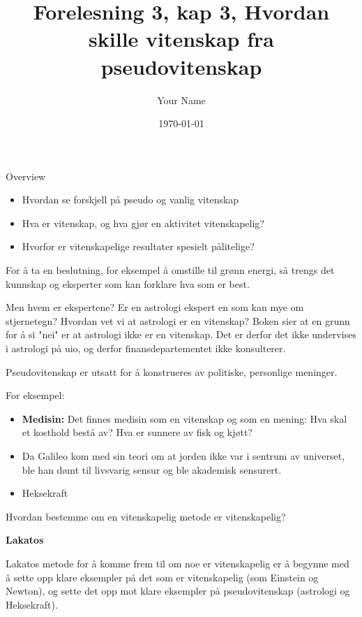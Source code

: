 \documentclass[11pt]{article}
\title{Forelesning 3, kap 3, Hvordan skille  vitenskap fra pseudovitenskap}
\author{Your Name}
\date{\today}
\begin{document}
\maketitle


\tableofcontents

Overview

\begin{itemize}
    \item Hvordan se forskjell på pseudo og vanlig vitenskap
    \item Hva er vitenskap, og hva gjør en aktivitet vitenskapelig?
    \item Hvorfor er vitenskapelige resultater spesielt pålitelige?
\end{itemize}


For å ta en beslutning, for eksempel å omstille til grønn energi,  så trengs det  kunnskap og eksperter som kan forklare  hva som er best.

Men hvem er ekspertene? Er en astrologi ekspert en som kan mye om stjernetegn? Hvordan vet vi at astrologi er en vitenskap?
Boken sier at en grunn for å si "nei" er at astrologi ikke er en vitenskap. Det er derfor  det ikke undervises i astrologi på uio, og derfor finansdepartementet ikke konsulterer.




Pseudovitenskap er utsatt for å konstrueres av politiske, personlige meninger.


For eksempel:
\begin{itemize}
    \item \textbf{Medisin:} Det finnes medisin som en vitenskap og som en mening: Hva skal et kosthold bestå av? Hva er sunnere av fisk og kjøtt?
    \item Da Galileo kom med sin teori om at jorden ikke var i sentrum av universet, ble han dømt til livsvarig sensur og ble akademisk sensurert.
    \item Heksekraft
\end{itemize}



Hvordan bestemme om en vitenskapelig metode er vitenskapelig?

\textbf{Lakatos}

Lakatos metode for å komme frem til om noe er vitenskapelig er å begynne med å sette opp klare eksempler på det som er vitenskapelig (som Einstein og Newton), og sette det opp mot klare eksempler på pseudovitenskap (astrologi og Heksekraft).
\end{document}
